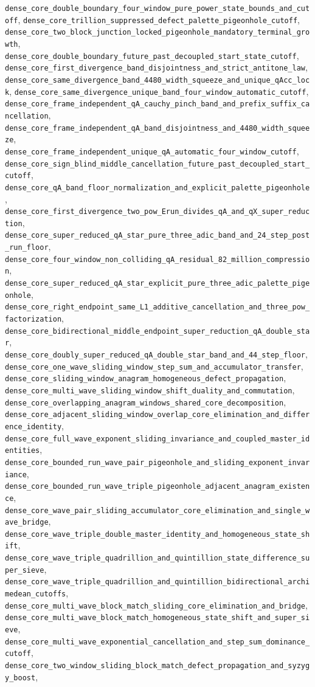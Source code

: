 \documentclass[11pt]{article}
\begin{document}
\begin{enumerate}
\texttt{dense\_core\_double\_boundary\_four\_window\_pure\_power\_state\_bounds\_and\_cutoff}, \texttt{dense\_core\_trillion\_suppressed\_defect\_palette\_pigeonhole\_cutoff}, \texttt{dense\_core\_two\_block\_junction\_locked\_pigeonhole\_mandatory\_terminal\_growth}, \texttt{dense\_core\_double\_boundary\_future\_past\_decoupled\_start\_state\_cutoff}, \texttt{dense\_core\_first\_divergence\_band\_disjointness\_and\_strict\_antitone\_law}, \texttt{dense\_core\_same\_divergence\_band\_4480\_width\_squeeze\_and\_unique\_qAcc\_lock}, \texttt{dense\_core\_same\_divergence\_unique\_band\_four\_window\_automatic\_cutoff}, \texttt{dense\_core\_frame\_independent\_qA\_cauchy\_pinch\_band\_and\_prefix\_suffix\_cancellation}, \texttt{dense\_core\_frame\_independent\_qA\_band\_disjointness\_and\_4480\_width\_squeeze}, \texttt{dense\_core\_frame\_independent\_unique\_qA\_automatic\_four\_window\_cutoff}, \texttt{dense\_core\_sign\_blind\_middle\_cancellation\_future\_past\_decoupled\_start\_cutoff}, \texttt{dense\_core\_qA\_band\_floor\_normalization\_and\_explicit\_palette\_pigeonhole}, \texttt{dense\_core\_first\_divergence\_two\_pow\_Erun\_divides\_qA\_and\_qX\_super\_reduction}, \texttt{dense\_core\_super\_reduced\_qA\_star\_pure\_three\_adic\_band\_and\_24\_step\_post\_run\_floor}, \texttt{dense\_core\_four\_window\_non\_colliding\_qA\_residual\_82\_million\_compression}, \texttt{dense\_core\_super\_reduced\_qA\_star\_explicit\_pure\_three\_adic\_palette\_pigeonhole}, \texttt{dense\_core\_right\_endpoint\_same\_L1\_additive\_cancellation\_and\_three\_pow\_factorization}, \texttt{dense\_core\_bidirectional\_middle\_endpoint\_super\_reduction\_qA\_double\_star}, \texttt{dense\_core\_doubly\_super\_reduced\_qA\_double\_star\_band\_and\_44\_step\_floor}, \texttt{dense\_core\_one\_wave\_sliding\_window\_step\_sum\_and\_accumulator\_transfer}, \texttt{dense\_core\_sliding\_window\_anagram\_homogeneous\_defect\_propagation}, \texttt{dense\_core\_multi\_wave\_sliding\_window\_shift\_duality\_and\_commutation}, \texttt{dense\_core\_overlapping\_anagram\_windows\_shared\_core\_decomposition}, \texttt{dense\_core\_adjacent\_sliding\_window\_overlap\_core\_elimination\_and\_difference\_identity}, \texttt{dense\_core\_full\_wave\_exponent\_sliding\_invariance\_and\_coupled\_master\_identities}, \texttt{dense\_core\_bounded\_run\_wave\_pair\_pigeonhole\_and\_sliding\_exponent\_invariance}, \texttt{dense\_core\_bounded\_run\_wave\_triple\_pigeonhole\_adjacent\_anagram\_existence}, \texttt{dense\_core\_wave\_pair\_sliding\_accumulator\_core\_elimination\_and\_single\_wave\_bridge}, \texttt{dense\_core\_wave\_triple\_double\_master\_identity\_and\_homogeneous\_state\_shift}, \texttt{dense\_core\_wave\_triple\_quadrillion\_and\_quintillion\_state\_difference\_super\_sieve}, \texttt{dense\_core\_wave\_triple\_quadrillion\_and\_quintillion\_bidirectional\_archimedean\_cutoffs}, \texttt{dense\_core\_multi\_wave\_block\_match\_sliding\_core\_elimination\_and\_bridge}, \texttt{dense\_core\_multi\_wave\_block\_match\_homogeneous\_state\_shift\_and\_super\_sieve}, \texttt{dense\_core\_multi\_wave\_exponential\_cancellation\_and\_step\_sum\_dominance\_cutoff}, \texttt{dense\_core\_two\_window\_sliding\_block\_match\_defect\_propagation\_and\_syzygy\_boost}, 
\end{enumerate}
\end{document}
